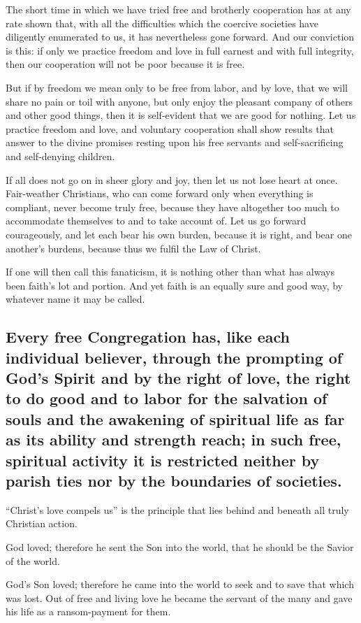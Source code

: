 The short time in which we have tried free and brotherly cooperation has at any rate shown that, with all the difficulties which the coercive societies have diligently enumerated to us, it has nevertheless gone forward. And our conviction is this: if only we practice freedom and love in full earnest and with full integrity, then our cooperation will not be poor because it is free.

But if by freedom we mean only to be free from labor, and by love, that we will share no pain or toil with anyone, but only enjoy the pleasant company of others and other good things, then it is self-evident that we are good for nothing. Let us practice freedom and love, and voluntary cooperation shall show results that answer to the divine promises resting upon his free servants and self-sacrificing and self-denying children.

If all does not go on in sheer glory and joy, then let us not lose heart at once. Fair-weather Christians, who can come forward only when everything is compliant, never become truly free, because they have altogether too much to accommodate themselves to and to take account of. Let us go forward courageously, and let each bear his own burden, because it is right, and bear one another’s burdens, because thus we fulfil the Law of Christ.

If one will then call this fanaticism, it is nothing other than what has always been faith’s lot and portion. And yet faith is an equally sure and good way, by whatever name it may be called.

\subsection{Every free Congregation has, like each individual believer, through the prompting of God’s Spirit and by the right of love, the right to do good and to labor for the salvation of souls and the awakening of spiritual life as far as its ability and strength reach; in such free, spiritual activity it is restricted neither by parish ties nor by the boundaries of societies.}

“Christ’s love compels us” is the principle that lies behind and beneath all truly Christian action.

God loved; therefore he sent the Son into the world, that he should be the Savior of the world.

God’s Son loved; therefore he came into the world to seek and to save that which was lost. Out of free and living love he became the servant of the many and gave his life as a ransom-payment for them.

